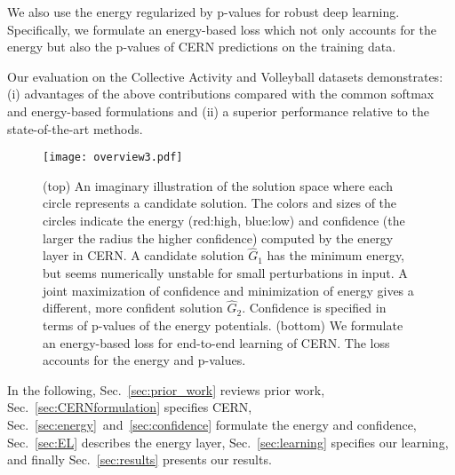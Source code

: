 \documentclass[10pt,twocolumn,letterpaper]{article}
\begin{document}
We also use the energy regularized by p-values for robust deep learning. Specifically, we formulate an energy-based loss which not only accounts for the energy but also the p-values of CERN predictions on the training data. 

Our evaluation on the Collective Activity \cite{Choi2009} and Volleyball \cite{Ibrahim2016} datasets demonstrates: (i) advantages of the above contributions compared with the common softmax and energy-based formulations and (ii) a superior performance relative to the state-of-the-art methods.

   \begin{figure}[t!]
      \centering
      \texttt{[image: overview3.pdf]}
      \caption{(top) An imaginary illustration of the solution space where each circle represents a candidate solution. The colors and sizes of the circles indicate the energy (red:high, blue:low) and confidence (the larger the radius the higher confidence) computed by the energy layer in CERN. A candidate solution $\hat{G}_1$ has the minimum energy, but seems numerically unstable for small perturbations in input. A joint maximization of confidence and minimization of energy gives a different, more confident solution $\hat{G}_2$. Confidence is specified in terms of p-values of the energy potentials. (bottom) We formulate an energy-based loss for end-to-end learning of CERN. The loss accounts for the energy and p-values.}
      \label{fig:framework}
   \end{figure}



In the following, Sec.~\ref{sec:prior_work} reviews prior work, Sec.~\ref{sec:CERNformulation} specifies CERN, Sec.~\ref{sec:energy}~and~\ref{sec:confidence} formulate the energy and confidence,  Sec.~\ref{sec:EL} describes the energy layer,  Sec.~\ref{sec:learning} specifies our  learning, and finally Sec.~\ref{sec:results} presents our results.
\end{document}
